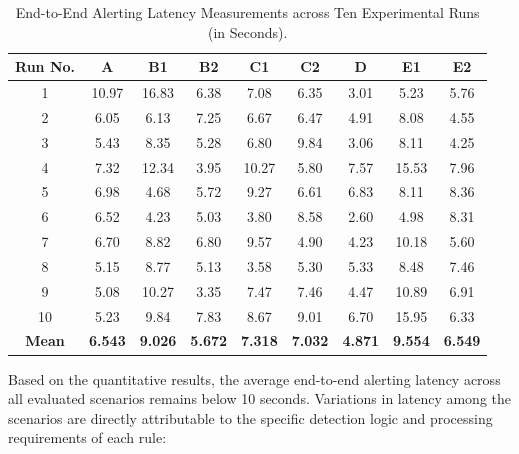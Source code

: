 \begin{table}[H]
\centering
\caption{End-to-End Alerting Latency Measurements across Ten Experimental Runs (in Seconds).}
\label{tab:latency_measurements}
\begin{tabular}{ccccccccc}
\toprule
\textbf{Run No.} & \textbf{A} & \textbf{B1} & \textbf{B2} & \textbf{C1} & \textbf{C2} & \textbf{D} & \textbf{E1} & \textbf{E2} \\ \midrule
1 & 10.97 & 16.83 & 6.38 & 7.08 & 6.35 & 3.01 & 5.23 & 5.76 \\
2 & 6.05 & 6.13 & 7.25 & 6.67 & 6.47 & 4.91 & 8.08 & 4.55 \\
3 & 5.43 & 8.35 & 5.28 & 6.80 & 9.84 & 3.06 & 8.11 & 4.25 \\
4 & 7.32 & 12.34 & 3.95 & 10.27 & 5.80 & 7.57 & 15.53 & 7.96 \\
5 & 6.98 & 4.68 & 5.72 & 9.27 & 6.61 & 6.83 & 8.11 & 8.36 \\
6 & 6.52 & 4.23 & 5.03 & 3.80 & 8.58 & 2.60 & 4.98 & 8.31 \\
7 & 6.70 & 8.82 & 6.80 & 9.57 & 4.90 & 4.23 & 10.18 & 5.60 \\
8 & 5.15 & 8.77 & 5.13 & 3.58 & 5.30 & 5.33 & 8.48 & 7.46 \\
9 & 5.08 & 10.27 & 3.35 & 7.47 & 7.46 & 4.47 & 10.89 & 6.91 \\
10 & 5.23 & 9.84 & 7.83 & 8.67 & 9.01 & 6.70 & 15.95 & 6.33 \\ \midrule
\textbf{Mean} & \textbf{6.543} & \textbf{9.026} & \textbf{5.672} & \textbf{7.318} & \textbf{7.032} & \textbf{4.871} & \textbf{9.554} & \textbf{6.549} \\ \bottomrule
\end{tabular}
\end{table}
Based on the quantitative results, the average end-to-end alerting latency across all evaluated scenarios remains below 10 seconds. Variations in latency among the scenarios are directly attributable to the specific detection logic and processing requirements of each rule:
